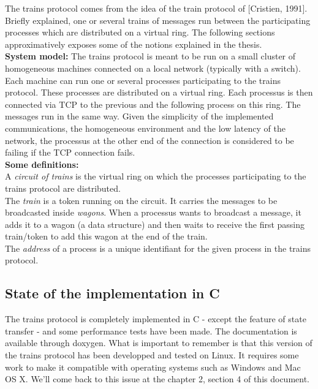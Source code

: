 \documentclass[a4paper,10pt]{report}
\begin{document}
The trains protocol comes from the idea of the train protocol of [Cristien, 1991]. Briefly explained, one or several trains of messages
run between the participating processes which are distributed on a virtual ring. The following sections approximatively exposes some of the
notions explained in the thesis.\\


\textbf{System model:} The trains protocol is meant to be run on a small cluster of homogeneous machines connected on a local network (typically with a switch). Each machine
can run one or several processes participating to the trains protocol. These processes are distributed on a virtual ring. Each processus is then
connected via TCP to the previous and the following process on this ring. The messages run in the same way.
Given the simplicity of the implemented communications, the homogeneous environment and the low latency of the network, the processus at the other end of the connection is considered to be failing if the TCP connection fails.\\


\textbf{Some definitions:}\\ 
A \textit{circuit of trains} is the virtual ring on which the processes participating to the 
trains protocol are distributed.\\
The \textit{train} is a token running on the circuit. It carries the messages to be broadcasted inside \textit{wagons}.
When a processus wants to broadcast a message, it adds it to a wagon (a data structure) and then waits to receive the first passing train/token to add
this wagon at the end of the train.\\
The \textit{address} of a process is a unique identifiant for the given process in the trains protocol.

\subsection{State of the implementation in C}

The trains protocol is completely implemented in C - except the feature of state transfer - and some performance tests have been made.
The documentation is available through doxygen.
What is important to remember is that this version of the trains protocol has been developped and tested on Linux. It requires 
some work to make it compatible with operating systems such as Windows and Mac OS X. We'll come back to this issue at the chapter 2, 
section 4 of this document.\\
\end{document}
